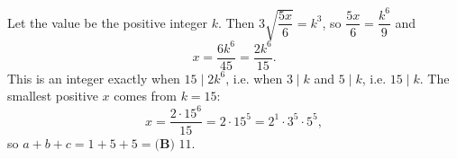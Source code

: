 Let the value be the positive integer $k$. Then $3\sqrt{\dfrac{5x}{6}}=k^3$, so $\dfrac{5x}{6}=\dfrac{k^6}{9}$ and
\[x=\dfrac{6k^6}{45}=\dfrac{2k^6}{15}.\]
This is an integer exactly when $15\mid2k^6$, i.e. when $3\mid k$ and $5\mid k$, i.e. $15\mid k$. The smallest positive $x$ comes from $k=15$:
\[x=\dfrac{2\cdot15^6}{15}=2\cdot15^5=2^1\cdot3^5\cdot5^5,\]
so $a+b+c=1+5+5=\boxed{\textbf{(B) }11}$.
